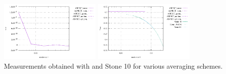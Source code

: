 \begin{center}
\includegraphics[width=5cm]{images/stokes_sphere3D/pressure_mean_FS}
\includegraphics[width=5cm]{images/stokes_sphere3D/pressure_max_FS}\\
{\captionfont Measurements obtained with \aspect and Stone 10 for various averaging schemes.}
\end{center}

